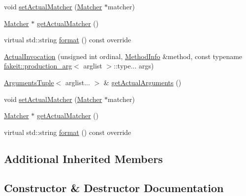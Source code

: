 \begin{DoxyCompactItemize}
void \mbox{\hyperlink{structfakeit_1_1ActualInvocation_abc95cd40eee8560cfcc69f0ab1c23713}{set\+Actual\+Matcher}} (\mbox{\hyperlink{structfakeit_1_1ActualInvocation_1_1Matcher}{Matcher}} $\ast$matcher)
\item 
\mbox{\hyperlink{structfakeit_1_1ActualInvocation_1_1Matcher}{Matcher}} $\ast$ \mbox{\hyperlink{structfakeit_1_1ActualInvocation_a656047cd638d3617bf9038d30aa6808b}{get\+Actual\+Matcher}} ()
\item 
virtual std\+::string \mbox{\hyperlink{structfakeit_1_1ActualInvocation_a84fc89352c4dfc5ff8b24239901f809a}{format}} () const override
\item 
\mbox{\hyperlink{structfakeit_1_1ActualInvocation_a99175c134863f4d8320da8b5fe4bd223}{Actual\+Invocation}} (unsigned int ordinal, \mbox{\hyperlink{structfakeit_1_1MethodInfo}{Method\+Info}} \&method, const typename \mbox{\hyperlink{structfakeit_1_1production__arg}{fakeit\+::production\+\_\+arg}}$<$ arglist $>$\+::type... args)
\item 
\mbox{\hyperlink{namespacefakeit_a476a37a598825e1b5dd67b3a176491a1}{Arguments\+Tuple}}$<$ arglist... $>$ \& \mbox{\hyperlink{structfakeit_1_1ActualInvocation_a90b32ff4f76fa609de50d72792657207}{get\+Actual\+Arguments}} ()
\item 
void \mbox{\hyperlink{structfakeit_1_1ActualInvocation_abc95cd40eee8560cfcc69f0ab1c23713}{set\+Actual\+Matcher}} (\mbox{\hyperlink{structfakeit_1_1ActualInvocation_1_1Matcher}{Matcher}} $\ast$matcher)
\item 
\mbox{\hyperlink{structfakeit_1_1ActualInvocation_1_1Matcher}{Matcher}} $\ast$ \mbox{\hyperlink{structfakeit_1_1ActualInvocation_a656047cd638d3617bf9038d30aa6808b}{get\+Actual\+Matcher}} ()
\item 
virtual std\+::string \mbox{\hyperlink{structfakeit_1_1ActualInvocation_a84fc89352c4dfc5ff8b24239901f809a}{format}} () const override
\end{DoxyCompactItemize}
\subsection*{Additional Inherited Members}


\subsection{Constructor \& Destructor Documentation}
\mbox{\label{structfakeit_1_1ActualInvocation_a99175c134863f4d8320da8b5fe4bd223}} 
